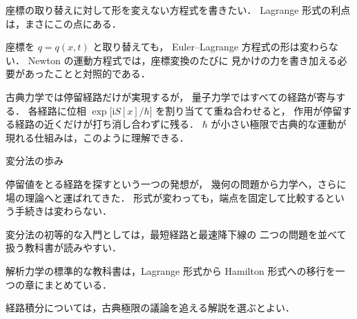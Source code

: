 \documentclass[lualatex,paper=b5j,fontsize=10pt,twoside]{jlreq}
\begin{document}
\begin{mkquote}
座標の取り替えに対して形を変えない方程式を書きたい．
Lagrange 形式の利点は，まさにこの点にある．
\end{mkquote}

座標を $q=q(x,t)$ と取り替えても，
Euler--Lagrange 方程式の形は変わらない．
Newton の運動方程式では，座標変換のたびに
見かけの力を書き加える必要があったことと対照的である．


古典力学では停留経路だけが実現するが，
量子力学ではすべての経路が寄与する．
各経路に位相 $\exp\bigl[\mathrm{i}S[x]/\hbar\bigr]$ を割り当てて重ね合わせると，
作用が停留する経路の近くだけが打ち消し合わずに残る．
$\hbar$ が小さい極限で古典的な運動が現れる仕組みは，このように理解できる．

\begin{mkchronology}{変分法の歩み}
\end{mkchronology}

停留値をとる経路を探すという一つの発想が，
幾何の問題から力学へ，さらに場の理論へと運ばれてきた．
形式が変わっても，端点を固定して比較するという手続きは変わらない．

\begin{mkreferences}
  \item 変分法の初等的な入門としては，最短経路と最速降下線の
    二つの問題を並べて扱う教科書が読みやすい．
  \item 解析力学の標準的な教科書は，Lagrange 形式から
    Hamilton 形式への移行を一つの章にまとめている．
  \item 経路積分については，古典極限の議論を追える解説を選ぶとよい．
\end{mkreferences}

\MKByline
\end{document}
